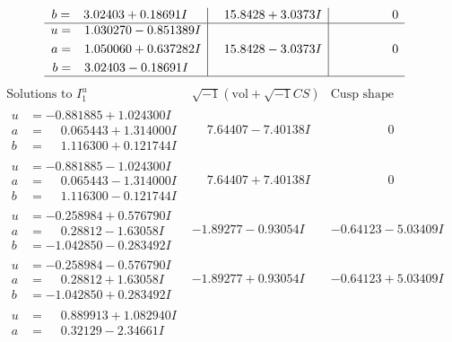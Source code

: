 \documentclass[1p]{elsarticle_modified}
\theoremstyle{definition}
\newcommand{\I}{\sqrt{-1}}
\begin{document}
$$\begin{array}{c|c|c}
\begin{aligned}
b &= \phantom{-}3.02403 + 0.18691 I\end{aligned}
 & \phantom{-}15.8428 + 3.0373 I & \phantom{-0.000000 } 0 \\ \hline\begin{aligned}
u &= \phantom{-}1.030270 - 0.851389 I \\
a &= \phantom{-}1.050060 + 0.637282 I \\
b &= \phantom{-}3.02403 - 0.18691 I\end{aligned}
 & \phantom{-}15.8428 - 3.0373 I & \phantom{-0.000000 } 0\\
 \hline 
 \end{array}$$\newpage$$\begin{array}{c|c|c}  
\text{Solutions to }I^u_{1}& \I (\text{vol} + \sqrt{-1}CS) & \text{Cusp shape}\\
 \hline 
\begin{aligned}
u &= -0.881885 + 1.024300 I \\
a &= \phantom{-}0.065443 + 1.314000 I \\
b &= \phantom{-}1.116300 + 0.121744 I\end{aligned}
 & \phantom{-}7.64407 - 7.40138 I & \phantom{-0.000000 } 0 \\ \hline\begin{aligned}
u &= -0.881885 - 1.024300 I \\
a &= \phantom{-}0.065443 - 1.314000 I \\
b &= \phantom{-}1.116300 - 0.121744 I\end{aligned}
 & \phantom{-}7.64407 + 7.40138 I & \phantom{-0.000000 } 0 \\ \hline\begin{aligned}
u &= -0.258984 + 0.576790 I \\
a &= \phantom{-}0.28812 - 1.63058 I \\
b &= -1.042850 - 0.283492 I\end{aligned}
 & -1.89277 - 0.93054 I & -0.64123 - 5.03409 I \\ \hline\begin{aligned}
u &= -0.258984 - 0.576790 I \\
a &= \phantom{-}0.28812 + 1.63058 I \\
b &= -1.042850 + 0.283492 I\end{aligned}
 & -1.89277 + 0.93054 I & -0.64123 + 5.03409 I \\ \hline\begin{aligned}
u &= \phantom{-}0.889913 + 1.082940 I \\
a &= \phantom{-}0.32129 - 2.34661 I \\

\end{aligned}
\end{array}$$
\end{document}
